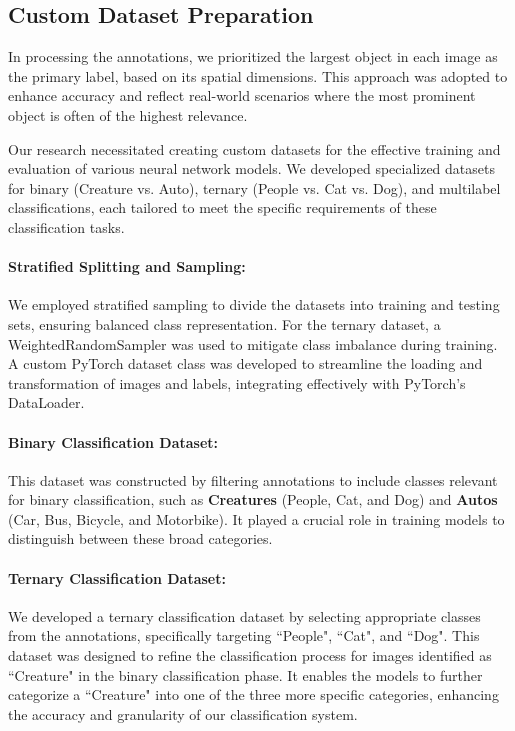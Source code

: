 \documentclass{article} %
\begin{document}
\subsection{Custom Dataset Preparation}
In processing the annotations, we prioritized the largest object in each image as the primary label, based on its spatial dimensions. This approach was adopted to enhance accuracy and reflect real-world scenarios where the most prominent object is often of the highest relevance.


Our research necessitated creating custom datasets for the effective training and evaluation of various neural network models. We developed specialized datasets for binary (Creature vs. Auto), ternary (People vs. Cat vs. Dog), and multilabel classifications, each tailored to meet the specific requirements of these classification tasks.


\paragraph{Stratified Splitting and Sampling:} We employed stratified sampling to divide the datasets into training and testing sets, ensuring balanced class representation. For the ternary dataset, a WeightedRandomSampler was used to mitigate class imbalance during training. A custom PyTorch dataset class was developed to streamline the loading and transformation of images and labels, integrating effectively with PyTorch's DataLoader.


\paragraph{Binary Classification Dataset:} This dataset was constructed by filtering annotations to include classes relevant for binary classification, such as \textbf{Creatures} (People, Cat, and Dog) and \textbf{Autos} (Car, Bus, Bicycle, and Motorbike). It played a crucial role in training models to distinguish between these broad categories.


\paragraph{Ternary Classification Dataset:} We developed a ternary classification dataset by selecting appropriate classes from the annotations, specifically targeting ``People", ``Cat", and ``Dog". This dataset was designed to refine the classification process for images identified as ``Creature" in the binary classification phase. It enables the models to further categorize a ``Creature" into one of the three more specific categories, enhancing the accuracy and granularity of our classification system.
\end{document}
